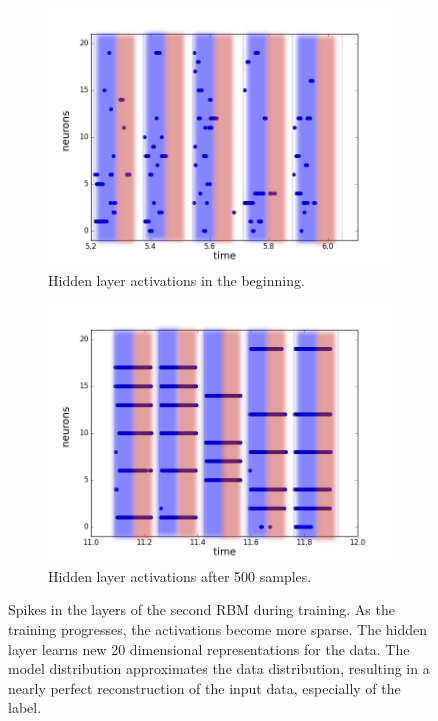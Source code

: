 \begin{figure}[h!]
	\begin{subfigure}[t]{.32\textwidth}
  		\centering
  		\includegraphics[width=.9\linewidth]{imgs/7x7/20076_h.png}
  		\caption{Hidden layer activations in the beginning.}
  		\label{fig:sub2}
	\end{subfigure}
	\begin{subfigure}[t]{.32\textwidth}
  		\centering
  		\includegraphics[width=.9\linewidth]{imgs/7x7/20946_h.png}
  		\caption{Hidden layer  activations after 500 samples.}
  		\label{fig:sub2}
	\end{subfigure}
	\caption[Spikes in the layers of the second RBM during training.]{Spikes in the layers of the second RBM during training. As the training progresses, the activations become more sparse. The hidden layer learns new 20 dimensional representations for the data. The model distribution approximates the data distribution, resulting in a nearly perfect reconstruction of the input data, especially of the label.}
	\label{fig:stripesspl2}
\end{figure}


